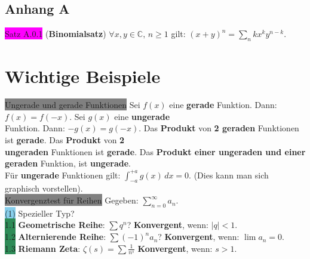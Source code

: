 \documentclass[10pt]{article}
\begin{document}
\subsection*{Anhang A}
\colorbox{magenta}{Satz A.0.1} (\textbf{Binomialsatz}) 
                \textcolor{NavyBlue}{$\forall x,y\in\mathbb{C},\,n\geqslant1$} gilt: 
                \textcolor{NavyBlue}{$(x+y)^n=\sum_{n}{k}x^ky^{n-k}$}.


\section{Wichtige Beispiele}
\colorbox{gray}{Ungerade und gerade Funktionen} Sei \textcolor{NavyBlue}{$f(x)$}
                eine \textbf{gerade} Funktion. Dann: \textcolor{NavyBlue}{$f(x)=f(-x)$}.
                Sei \textcolor{NavyBlue}{$g(x)$} eine \textbf{ungerade} \\
        \indent Funktion. Dann: \textcolor{NavyBlue}{$-g(x)=g(-x)$}.
                Das \textbf{Produkt} von \textbf{2 geraden} Funktionen 
                ist \textbf{gerade}. Das \textbf{Produkt} von \textbf{2 \\
        \indent ungeraden}
                Funktionen ist \textbf{gerade}. Das \textbf{Produkt einer 
                ungeraden und einer geraden} Funktion,
                ist \textbf{ungerade}.\\
        \indent Für \textbf{ungerade} Funktionen gilt:
                \textcolor{NavyBlue}{$\int_{-a}^{+a}g(x)\,dx=0$}. (Dies kann man sich
                graphisch vorstellen).\\
\colorbox{gray}{Konvergenztest für Reihen}
                Gegeben: \textcolor{NavyBlue}{$\sum_{n=0}^\infty a_n$}.\\
        \indent \colorbox{SkyBlue}{(1)} Spezieller Typ?\\
        \indent\indent \colorbox{SeaGreen}{1.1} \textbf{Geometrische Reihe}: 
                \textcolor{NavyBlue}{$\sum q^n$}? 
                \textbf{Konvergent}, 
                wenn: \textcolor{NavyBlue}{$|q|<1$}.\\
        \indent\indent \colorbox{SeaGreen}{1.2} \textbf{Alternierende Reihe}: 
                \textcolor{NavyBlue}{$\sum(-1)^na_n$}? 
                \textbf{Konvergent}, wenn:
                \textcolor{NavyBlue}{$\lim a_n=0$}.\\
        \indent\indent \colorbox{SeaGreen}{1.3} \textbf{Riemann Zeta}: 
                \textcolor{NavyBlue}{$\zeta(s)=\sum\frac{1}{n^s}$} 
                \textbf{Konvergent}, wenn: \textcolor{NavyBlue}{$s>1$}.\\
\end{document}
